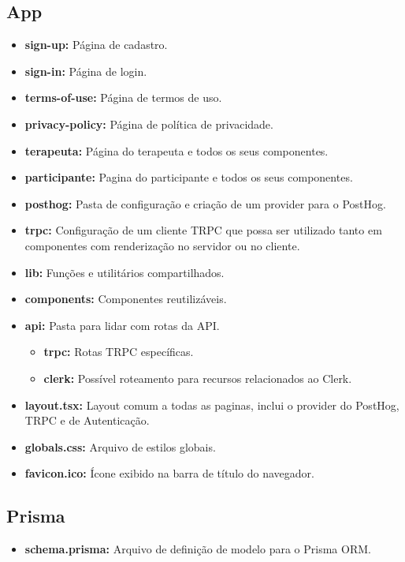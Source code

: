 \subsection{App}
\label{app}
\begin{itemize}
\item \textbf{sign-up:} Página de cadastro.
\item \textbf{sign-in:} Página de login.
\item \textbf{terms-of-use:} Página de termos de uso.
\item \textbf{privacy-policy:} Página de política de privacidade.
\item \textbf{terapeuta:} Página do terapeuta e todos os seus componentes.
\item \textbf{participante:} Pagina do participante e todos os seus componentes.

\item \textbf{posthog:} Pasta de configuração e criação de um provider para o PostHog.
\item \textbf{trpc:} Configuração de um cliente TRPC que possa ser utilizado tanto em componentes com renderização no servidor ou no cliente.
\item \textbf{lib:} Funções e utilitários compartilhados.
\item \textbf{components:} Componentes reutilizáveis.


\item \textbf{api:} Pasta para lidar com rotas da API.
\begin{itemize}
\item \textbf{trpc:} Rotas TRPC específicas.
\item \textbf{clerk:} Possível roteamento para recursos relacionados ao Clerk.
\end{itemize}

\item \textbf{layout.tsx:} Layout comum a todas as paginas, inclui o provider do PostHog, TRPC e de Autenticação.
\item \textbf{globals.css:} Arquivo de estilos globais.
\item \textbf{favicon.ico:} Ícone exibido na barra de título do navegador.
\end{itemize}


\subsection{Prisma}
\label{prisma}
\begin{itemize}
\item \textbf{schema.prisma:} Arquivo de definição de modelo para o Prisma ORM.
\end{itemize}

